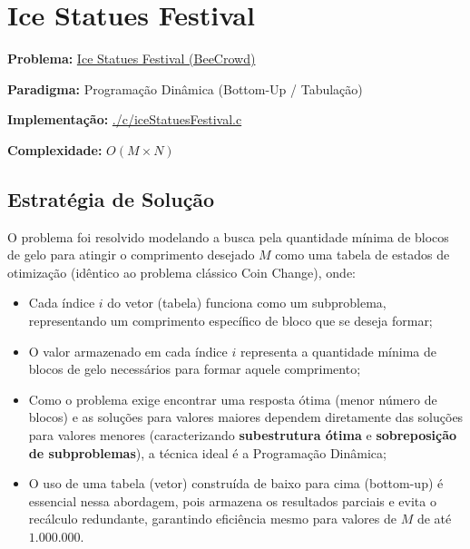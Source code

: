 \documentclass[
    12pt,
    oneside,
    a4paper,
    brazil
]{abntex2}
\begin{document}
\chapter{Ice Statues Festival}

\textbf{Problema:} \href{https://judge.beecrowd.com/en/problems/view/1034}{Ice Statues Festival (BeeCrowd)}

\textbf{Paradigma:} Programação Dinâmica (Bottom-Up / Tabulação)

\textbf{Implementação:} \href{https://github.com/BccMaterial/AA-Trabalho/blob/main/c/iceStatuesFestival.c}{./c/iceStatuesFestival.c}

\textbf{Complexidade:} $O(M \times N)$

\section{Estratégia de Solução}

O problema foi resolvido modelando a busca pela quantidade mínima de blocos de gelo para atingir o comprimento desejado $M$ como uma tabela de estados de otimização (idêntico ao problema clássico Coin Change), onde:
\begin{itemize}
	\item{Cada índice $i$ do vetor (tabela) funciona como um subproblema, representando um comprimento específico de bloco que se deseja formar;}
	\item{O valor armazenado em cada índice $i$ representa a quantidade mínima de blocos de gelo necessários para formar aquele comprimento;}
	\item{Como o problema exige encontrar uma resposta ótima (menor número de blocos) e as soluções para valores maiores dependem diretamente das soluções para valores menores (caracterizando \textbf{subestrutura ótima} e \textbf{sobreposição de subproblemas}), a técnica ideal é a Programação Dinâmica;}
	\item{O uso de uma tabela (vetor) construída de baixo para cima (bottom-up) é essencial nessa abordagem, pois armazena os resultados parciais e evita o recálculo redundante, garantindo eficiência mesmo para valores de $M$ de até $1.000.000$.}
\end{itemize}
\end{document}
